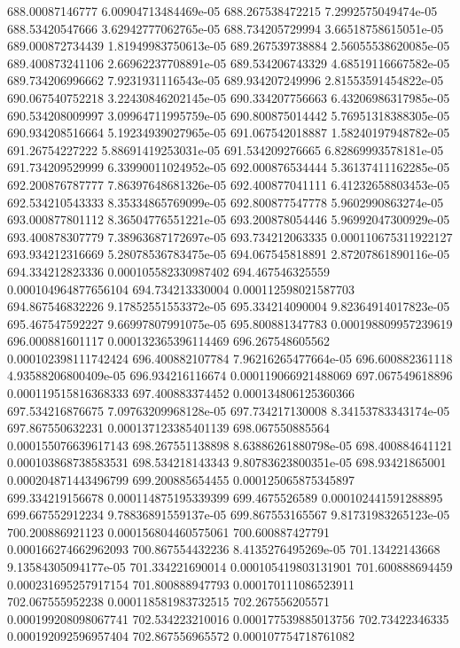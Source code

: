 {688.00087146777 6.00904713484469e-05
688.267538472215 7.2992575049474e-05
688.53420547666 3.62942777062765e-05
688.734205729994 3.66518758615051e-05
689.000872734439 1.81949983750613e-05
689.267539738884 2.56055538620085e-05
689.400873241106 2.66962237708891e-05
689.534206743329 4.68519116667582e-05
689.734206996662 7.9231931116543e-05
689.934207249996 2.81553591454822e-05
690.067540752218 3.22430846202145e-05
690.334207756663 6.43206986317985e-05
690.534208009997 3.09964711995759e-05
690.800875014442 5.76951318388305e-05
690.934208516664 5.19234939027965e-05
691.067542018887 1.58240197948782e-05
691.26754227222 5.88691419253031e-05
691.534209276665 6.82869993578181e-05
691.734209529999 6.33990011024952e-05
692.000876534444 5.36137411162285e-05
692.200876787777 7.86397648681326e-05
692.400877041111 6.41232658803453e-05
692.534210543333 8.35334865769099e-05
692.800877547778 5.9602990863274e-05
693.000877801112 8.36504776551221e-05
693.200878054446 5.96992047300929e-05
693.400878307779 7.38963687172697e-05
693.734212063335 0.000110675311922127
693.934212316669 5.28078536783475e-05
694.067545818891 2.87207861890116e-05
694.334212823336 0.000105582330987402
694.467546325559 0.000104964877656104
694.734213330004 0.000112598021587703
694.867546832226 9.17852551553372e-05
695.334214090004 9.82364914017823e-05
695.467547592227 9.66997807991075e-05
695.800881347783 0.000198809957239619
696.000881601117 0.000132365396114469
696.267548605562 0.000102398111742424
696.400882107784 7.96216265477664e-05
696.600882361118 4.93588206800409e-05
696.934216116674 0.000119066921488069
697.067549618896 0.000119515816368333
697.400883374452 0.000134806125360366
697.534216876675 7.09763209968128e-05
697.734217130008 8.34153783343174e-05
697.867550632231 0.000137123385401139
698.067550885564 0.000155076639617143
698.267551138898 8.63886261880798e-05
698.400884641121 0.000103868738583531
698.534218143343 9.80783623800351e-05
698.93421865001 0.000204871443496799
699.200885654455 0.000125065875345897
699.334219156678 0.000114875195339399
699.4675526589 0.000102441591288895
699.667552912234 9.78836891559137e-05
699.867553165567 9.81731983265123e-05
700.200886921123 0.000156804460575061
700.600887427791 0.000166274662962093
700.867554432236 8.4135276495269e-05
701.13422143668 9.13584305094177e-05
701.334221690014 0.000105419803131901
701.600888694459 0.000231695257917154
701.800888947793 0.000170111086523911
702.067555952238 0.000118581983732515
702.267556205571 0.000199208098067741
702.534223210016 0.000177539885013756
702.73422346335 0.000192092596957404
702.867556965572 0.000107754718761082
}
